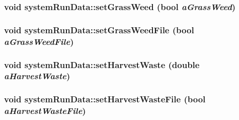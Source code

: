 \label{classsystem_run_data_a12733d14d75b6d359536b0be5cdac074}
\hypertarget{classsystem_run_data_ad920f3c6680820f98e49237e4fd7240f}{
\subsubsection[{setGrassWeed}]{\setlength{\rightskip}{0pt plus 5cm}void systemRunData::setGrassWeed (bool {\em aGrassWeed})}}
\label{classsystem_run_data_ad920f3c6680820f98e49237e4fd7240f}
\hypertarget{classsystem_run_data_a7a7e9f015f0cf1576afd76e7d5688fde}{
\subsubsection[{setGrassWeedFile}]{\setlength{\rightskip}{0pt plus 5cm}void systemRunData::setGrassWeedFile (bool {\em aGrassWeedFile})}}
\label{classsystem_run_data_a7a7e9f015f0cf1576afd76e7d5688fde}
\hypertarget{classsystem_run_data_aef021f99f500ebb6bcf630af2c280f68}{
\subsubsection[{setHarvestWaste}]{\setlength{\rightskip}{0pt plus 5cm}void systemRunData::setHarvestWaste (double {\em aHarvestWaste})}}
\label{classsystem_run_data_aef021f99f500ebb6bcf630af2c280f68}
\hypertarget{classsystem_run_data_aad9a2f50dfcaf2c682ad1e5d9e31d724}{
\subsubsection[{setHarvestWasteFile}]{\setlength{\rightskip}{0pt plus 5cm}void systemRunData::setHarvestWasteFile (bool {\em aHarvestWasteFile})}}
